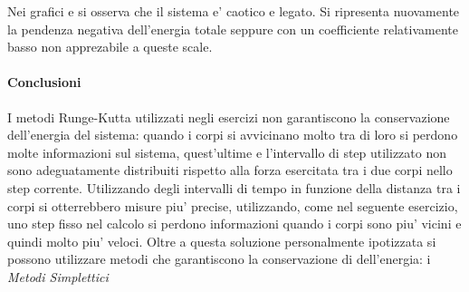 \begin{enumerate}

        Nei grafici  e  si osserva che il sistema e' caotico e legato. Si ripresenta nuovamente la pendenza negativa dell'energia totale seppure con un coefficiente relativamente basso non apprezabile a queste scale.


\paragraph{Conclusioni}

I metodi Runge-Kutta utilizzati negli esercizi non garantiscono la conservazione dell'energia del sistema: quando i corpi si avvicinano molto tra di loro si perdono molte informazioni sul sistema, quest'ultime e l'intervallo di step utilizzato non sono adeguatamente distribuiti rispetto alla forza esercitata tra i due corpi nello step corrente. Utilizzando degli intervalli di tempo in funzione della distanza tra i corpi si otterrebbero misure piu' precise, utilizzando, come nel seguente esercizio, uno step fisso nel calcolo si perdono informazioni quando i corpi sono piu' vicini e quindi molto piu' veloci. Oltre a questa soluzione personalmente ipotizzata si possono utilizzare metodi che garantiscono la conservazione di dell'energia: i \textit{Metodi Simplettici} 








\end{enumerate}









